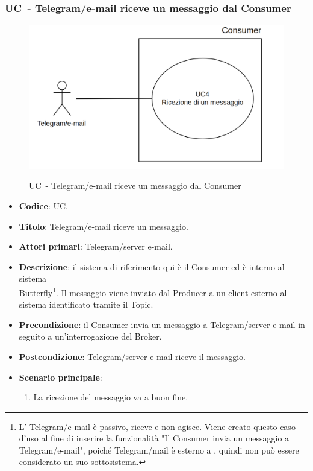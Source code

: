 \subsubsection{UC\theuccount\ - Telegram/e-mail riceve un messaggio dal Consumer}
	\begin{figure}[H]
		\centering
			\includegraphics[width=0.7\columnwidth]{img/UC4.png}\\
		\caption{UC\theuccount\ - Telegram/e-mail riceve un messaggio dal Consumer}
	\end{figure}
	\begin{itemize}
		\item \textbf{Codice}: UC\theuccount.
		\item \textbf{Titolo}: Telegram/e-mail riceve un messaggio.
		\item \textbf{Attori primari}: Telegram/server e-mail.
		\item \textbf{Descrizione}: il sistema di riferimento qui è il Consumer ed è interno al sistema\\Butterfly\footnote{L' Telegram/e-mail è passivo, riceve e non agisce. Viene creato questo caso d'uso al fine di inserire la funzionalità "Il Consumer invia un messaggio a Telegram/e-mail", poiché Telegram/mail è esterno a \progetto, quindi non può essere considerato un suo sottosistema.}.
		Il messaggio viene inviato dal Producer a un client esterno al sistema identificato tramite il Topic.
		
		\item \textbf{Precondizione}: il Consumer invia un messaggio a Telegram/server e-mail in seguito a un'interrogazione del Broker.
		\item \textbf{Postcondizione}: Telegram/server e-mail riceve il messaggio.
		\item \textbf{Scenario principale}:
		\begin{enumerate}
			\item La ricezione del messaggio va a buon fine.
		\end{enumerate} 
	\end{itemize}

